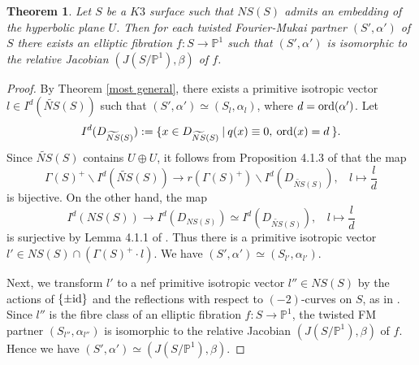 \documentclass{article}
\theoremstyle{plain}
\newtheorem{theorem}{Theorem}[section]
\theoremstyle{definition}
\theoremstyle{remark}
\newcommand{\proj}{{\mathbb P}}
\begin{document}
\begin{theorem}\label{twisted partners and relative Jacobians} 
Let $S$ be a $K3$ surface 
such that $NS(S)$ admits an embedding of the hyperbolic plane $U$.  
Then for each twisted Fourier-Mukai partner $(S', \alpha ')$ of $S$ 
there exists an elliptic fibration 
$f : S \to {\proj}^{1}$ such that 
$(S', \alpha ')$ 
is isomorphic to 
the relative Jacobian $(J(S/{\proj}^{1}), \beta )$ of $f$. 
\end{theorem} 







\begin{proof}
By Theorem \ref{most general}, 
there exists a primitive isotropic vector 
$l \in I^{d}(\widetilde{NS}(S))$ 
such that 
$(S', \alpha ') \simeq (S_{l}, \alpha _{l})$, 
where $d = {\rm ord\/}(\alpha ')$. 
Let 
\begin{equation*}
I^{d}(D_{\widetilde{NS}(S)}) := \{  x \in D_{\widetilde{NS}(S)} \: |  \: q(x) \equiv 0, \: {\rm ord\/}(x)=d \: \}. 
\end{equation*} 
Since 
$\widetilde{NS}(S)$ contains $U\oplus U$, 
it follows from Proposition 4.1.3 of \cite{Sc} that 
the map 
\begin{equation}\label{Scattone  bijective}
\Gamma (S)^{+} \backslash I^{d}(\widetilde{NS}(S)) 
\longrightarrow 
r(\Gamma (S)^{+}) \backslash I^{d}(D_{\widetilde{NS}(S)}) ,  \: \: \: \: 
l \mapsto \frac{l}{d}
\end{equation}
is bijective. 
On the other hand, 
the map 
\begin{equation*}\label{Scattone  surjective}
I^{d}(NS(S)) 
\longrightarrow 
I^{d}(D_{NS(S)}) 
\simeq 
I^{d}(D_{\widetilde{NS}(S)}),  \: \: \: \: 
l \mapsto \frac{l}{d}
\end{equation*}
is surjective 
by Lemma 4.1.1 of \cite{Sc}. 
Thus 
there is a primitive isotropic vector 
$l' \in NS(S) \cap (\Gamma (S)^{+}\cdot l)$. 
We have 
$(S', \alpha ') \simeq (S_{l'}, \alpha _{l'})$. 


Next,   
we transform $l'$ 
to a nef primitive isotropic vector $l'' \in NS(S)$
by the actions of 
$\{ \pm {\rm id\/} \}$ and 
the reflections with respect to 
$(-2)$-curves on $S$, as in \cite{PS-S}. 
Since 
$l''$ is the fibre class of an elliptic fibration $f : S \to {\proj}^{1}$,  
the twisted FM partner  
$(S_{l''}, \alpha _{l''})$ is isomorphic to the relative Jacobian $(J(S/{\proj}^{1}), \beta )$ of $f$.  
Hence  
we have 
$(S', \alpha ') \simeq (J(S/{\proj}^{1}), \beta )$. 
\end{proof}
\end{document}
